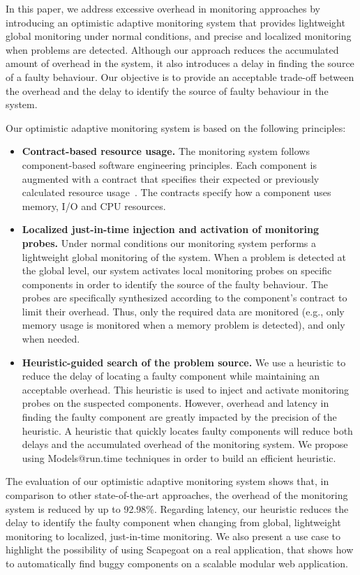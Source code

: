 In this paper, we address excessive overhead in monitoring approaches by introducing an optimistic adaptive monitoring system that provides lightweight global monitoring under normal conditions, and precise and localized monitoring when problems are detected.
Although our approach reduces the accumulated amount of overhead in the system, it also introduces a delay in finding the source of a faulty behaviour.
Our objective is to provide an acceptable trade-off between the overhead and the delay to identify the source of faulty behaviour in the system.

Our optimistic adaptive monitoring system is based on the following principles:
\begin{itemize}
\leftskip -.2in %
 \item \textbf{Contract-based resource usage.}
The monitoring system follows component-based software engineering principles. 
Each component is augmented with a contract that specifies their expected or previously calculated resource usage~\cite{Beugnard:1999:MCC:619042.621275}. 
The contracts specify how a component uses memory, I/O and CPU resources.
 \item \textbf{Localized just-in-time injection and activation of monitoring probes.} 
Under normal conditions our monitoring system performs a lightweight global monitoring of the system. 
When a problem is detected at the global level, our system activates local monitoring probes on specific components in order to identify the source of the faulty behaviour.
The probes are specifically synthesized according to the component's contract to limit their overhead.
Thus, only the required data are monitored (e.g., only memory usage is monitored when a memory problem is detected), and only when needed.
  \item \textbf{Heuristic-guided search of the problem source.} 
We use a heuristic to reduce the delay of locating a faulty component while maintaining an acceptable overhead.
This heuristic is used to inject and activate monitoring probes on the suspected components. 
However, overhead and latency in finding the faulty component are greatly impacted by the precision of the heuristic.
A heuristic that quickly locates faulty components will reduce both delays and the accumulated overhead of the monitoring system.
We propose using Models@run.time techniques in order to build an efficient heuristic.
\end{itemize}

The evaluation of our optimistic adaptive monitoring system shows that, in comparison to other state-of-the-art approaches, the overhead of the monitoring system is reduced by up to 92.98\%.
Regarding latency, our heuristic reduces the delay to identify the faulty component when changing from global, lightweight monitoring to localized, just-in-time monitoring.
We also present a use case to highlight the possibility of using Scapegoat on a real application, that shows how to automatically find buggy components on a scalable modular web application.

